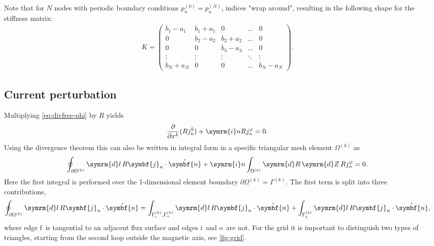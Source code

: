 \documentclass[a4paper, 10pt, english]{article}
\let\temp\varrho
\let\varrho\rho
\let\rho\temp
\let\temp\vartheta
\let\vartheta\theta
\let\theta\temp
\let\temp\varphi
\let\varphi\phi
\let\phi\temp
\let\vec\symbf
\newcommand*\diff{\ensuremath{\symrm{d}}}  %
\newcommand*\im{\ensuremath{\symrm{i}}}  %
\newcommand*\pd[2][]{\ensuremath{\frac{\partial #1}{\partial #2}}}  %
\newcommand*\fs{\ensuremath{\textrm{f}}}  %
\newcommand*\inw{\ensuremath{\textrm{i}}}  %
\newcommand*\out{\ensuremath{\textrm{o}}}  %
\begin{document}
Note that for $N$ nodes with periodic boundary conditions $p_{n}^{(0)} = p_{n}^{(N)}$, indices "wrap around", resulting in the following shape for the stiffness matrix:
\begin{gather*}
  K = \begin{pmatrix}
    b_{1} - a_{1} &  b_{1} + a_{1} &        0       & \hdots &    0   \\
           0       & b_{2} - a_{2} &  b_{2} + a_{2} & \hdots &    0   \\
           0       &        0       & b_{3} - a_{3} & \hdots &    0   \\
        \vdots     &     \vdots     &     \vdots     & \ddots & \vdots \\
     b_{N} + a_{N} &        0       &        0       & \hdots & b_{N} - a_{N}
  \end{pmatrix}.
\end{gather*}

\subsection{Current perturbation}
\label{sec:compute_currn}

Multiplying \cref{eq:divfree-phi} by $R$ yields
\begin{gather}
  \pd{x^{k}} (R j_{n}^{k}) + \im n R j_{n}^{\phi} = 0.
\end{gather}
Using the divergence theorem this can also be written in integral form in a specific triangular mesh element $\Omega^{(k)}$ as
\begin{gather}
  \oint_{\partial \Omega^{(k)}} \diff l \, R \vec{j}_{n} \cdot \hat{\vec{n}} + \im n \int_{\Omega^{(k)}} \diff R \, \diff Z \, R j_{n}^{\phi} = 0.
\end{gather}
Here the first integral is performed over the 1-dimensional element boundary $\partial \Omega^{(k)} = \Gamma^{(k)}$. The first term is split into three contributions,
\begin{gather}
  \oint_{\partial \Omega^{(k)}} \diff l \, R \vec{j}_{n} \cdot \hat{\vec{n}} = \int_{\Gamma_{\inw}^{(k)}, \Gamma_{\out}^{(k)}} \diff l \, R \vec{j}_{n} \cdot \hat{\vec{n}} + \int_{\Gamma_{\fs}^{(k)}} \diff l \, R \vec{j}_{n} \cdot \hat{\vec{n}},
\end{gather}
where edge \fs\ is tangential to an adjacent flux surface and edges \inw\ and \out\ are not. For the grid it is important to distinguish two types of triangles, starting from the second loop outside the magnetic axis, see \cref{fig:grid}.
\end{document}
